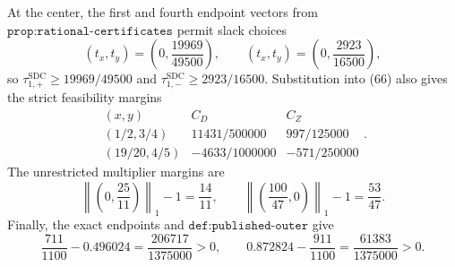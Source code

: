 At the center, the first and fourth endpoint vectors from \(\texttt{prop:rational-certificates}\) permit slack choices
\[
 (t_x,t_y)=\left(0,\frac{19969}{49500}\right),
 \qquad
 (t_x,t_y)=\left(0,\frac{2923}{16500}\right),                                \tag{67}
\]
so \(\tau_{1,+}^{\mathrm{SDC}}\ge19969/49500\) and \(\tau_{1,-}^{\mathrm{SDC}}\ge2923/16500\).  Substitution into (66) also gives the strict feasibility margins
\[
\begin{array}{c|cc}
(x,y)&C_D&C_Z\\ \hline
(1/2,3/4)&11431/500000&997/125000\\
(19/20,4/5)&-4633/1000000&-571/250000
\end{array}.                                                                  \tag{68}
\]
The unrestricted multiplier margins are
\[
 \left\|\left(0,\frac{25}{11}\right)\right\|_1-1=\frac{14}{11},
 \qquad
 \left\|\left(\frac{100}{47},0\right)\right\|_1-1=\frac{53}{47}.          \tag{69}
\]
Finally, the exact endpoints and \(\texttt{def:published-outer}\) give
\[
 \frac{711}{1100}-0.496024=\frac{206717}{1375000}>0,
 \qquad
 0.872824-\frac{911}{1100}=\frac{61383}{1375000}>0.                           \tag{70}
\]

